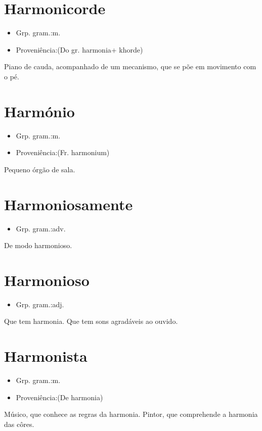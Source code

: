 \documentclass{article}
\begin{document}
\section{Harmonicorde}
\begin{itemize}
\item {Grp. gram.:m.}
\end{itemize}
\begin{itemize}
\item {Proveniência:(Do gr. \textunderscore harmonia\textunderscore  + \textunderscore khorde\textunderscore )}
\end{itemize}
Piano de cauda, acompanhado de um mecanismo, que se põe em movimento com o pé.
\section{Harmónio}
\begin{itemize}
\item {Grp. gram.:m.}
\end{itemize}
\begin{itemize}
\item {Proveniência:(Fr. \textunderscore harmonium\textunderscore )}
\end{itemize}
Pequeno órgão de sala.
\section{Harmoniosamente}
\begin{itemize}
\item {Grp. gram.:adv.}
\end{itemize}
De modo harmonioso.
\section{Harmonioso}
\begin{itemize}
\item {Grp. gram.:adj.}
\end{itemize}
Que tem harmonia.
Que tem sons agradáveis ao ouvido.
\section{Harmonista}
\begin{itemize}
\item {Grp. gram.:m.}
\end{itemize}
\begin{itemize}
\item {Proveniência:(De \textunderscore harmonia\textunderscore )}
\end{itemize}
Músico, que conhece as regras da harmonia.
Pintor, que comprehende a harmonia das côres.
\end{document}
